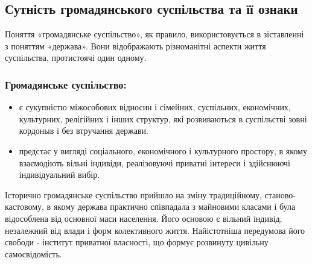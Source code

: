 \subsection{Сутність громадянського суспільства та її ознаки}
Поняття «громадянське суспільство», як правило, використовується в зіставленні з поняттям «держава». Вони відображають різноманітні аспекти життя суспільства, протистоячі один одному.
\subsubsection{Громадянське суспільство:}
\begin{itemize}
\item є сукупністю міжособових відносин і сімейних, суспільних, економічних, культурних, релігійних і інших структур, які розвиваються в суспільстві зовні кордоныв і без втручання держави.
\item предстає у вигляді соціального, економічного і культурного простору, в якому взаємодіють вільні індивіди, реалізовуючі приватні інтереси і здійснюючі індивідуальний вибір.
\end{itemize}
Історично громадянське суспільство прийшло на зміну традиційному, станово-кастовому, в якому держава практично співпадала з майновими класами і була відособлена від основної маси населення. Його основою є вільний індивід, незалежний від влади і форм колективного життя. Найістотніша передумова його свободи - інститут приватної власності, що формує розвинуту цивільну самосвідомість.

